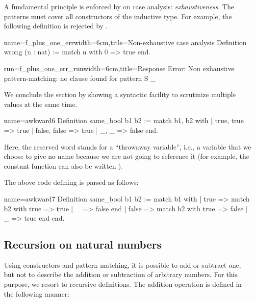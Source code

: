 A fundamental principle is enforced by \Coq{} on case analysis:
\emph{exhaustiveness}.  The patterns must cover all constructors of
the inductive type.  For example, the following definition is
rejected by \Coq{}.

\begin{coq}{name=f_plus_one_err}{width=6cm,title=Non-exhaustive case analysis}
Definition wrong (n : nat) :=
  match n with 0 => true end.
$~$
\end{coq}
\begin{coqout}{run=f_plus_one_err_run}{width=6cm,title=Response}
Error: Non exhaustive pattern-matching:
no clause found for
pattern S _
\end{coqout}

We conclude the section by showing a syntactic facility to scrutinize
multiple values at the same time.

\begin{coq}{name=awkward6}{}
Definition same_bool b1 b2 :=
  match b1, b2 with
  | true, true => true
  | false, false => true
  | _, _ => false
  end.
\end{coq}

Here, the reserved word \C{_} stands for a ``throwaway variable'', i.e.,
a variable that we choose to give no name because we are not going to
reference it (for example, the constant function
 can also be written
).
\index[coq]{\C{_}}

The above code defining  is parsed as follows:

\begin{coq}{name=awkward7}{}
Definition same_bool b1 b2 :=
  match b1 with
  | true => match b2 with true => true | _ => false end
  | false => match b2 with true => false | _ => true end
  end.
\end{coq}


\subsection{Recursion on natural numbers}\label{ssec:recnat}


Using constructors and pattern matching, it is possible to add or
subtract one, but not to describe the addition or subtraction of
arbitrary numbers. For this purpose, we resort to recursive
definitions. The addition operation is defined in the
following manner:

